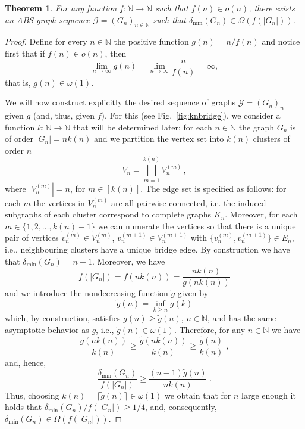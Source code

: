 \documentclass[a4paper,onecolumn,accepted=2024-12-14]{quantumarticle}
\newtheorem{theorem}{Theorem}[section]%
\theoremstyle{plain}
\newcommand{\cG}{{\mathcal G}}         %
\newcommand{\N}{\mathbb{N}} %
\begin{document}
\begin{theorem}\label{th:highdegABS}
For any function $f\colon\mathbb{N}\to\mathbb{N}$ such that $f(n)\in o(n)$, there exists an ABS graph sequence $\mathcal{G}=(G_n)_{n\in\mathbb{N}}$ such that
$\delta_{\mathrm{min}}(G_n)\in\Omega(f(|G_n|))$.
\end{theorem}
\begin{proof}
Define for every $n\in\mathbb{N}$ the positive function $g(n)=n/f(n)$ and notice first that if $f(n)\in o(n)$, then
\begin{equation}\label{eq:highdegABS}
    \lim_{n\to\infty} g(n)=\lim_{n\to\infty}\frac{n}{f(n)}=\infty,
\end{equation}
that is, $g(n)\in\omega(1)$.

We will now construct explicitly the desired sequence of graphs $\cG=(G_n)_n$ given $g$ (and, thus, given $f$).
For this (see Fig.~\ref{fig:knbridge}), we consider a function $k\colon\mathbb{N}\to\mathbb{N}$ that will be determined later; for each $n\in\N$ the graph $G_n$ is of order
$|G_n|=nk(n)$ and we partition the vertex set into $k(n)$ clusters of
order $n$
\begin{equation}
V_n=\bigsqcup_{m=1}^{k(n)}V_n^{(m)}\,,
\end{equation}
where $|V_n^{(m)}|=n$, for $m\in [k(n)]$. The edge set is specified as follows: for each $m$ the vertices in $V_n^{(m)}$ are all pairwise connected, i.e.
the induced subgraphs of each cluster correspond to complete graphs $K_n$.
Moreover, for each $m\in \{ 1,2,\dots,k(n)-1\}$ we can numerate the vertices
so that there is a unique pair of vertices $v_n^{(m)}\in V_n^{(m)}$,
$v_n^{(m+1)}\in V_n^{(m+1)}$ with $\{v_n^{(m)},v_n^{(m+1)}\}\in E_n$,
i.e., neighbouring clusters have a unique bridge edge. By construction
we have that $\delta_{\mathrm{min}}(G_n)=n-1$. Moreover, we have
\begin{equation}
f(|G_n|)=f(nk(n))=\frac{nk(n)}{g(nk(n))}
\end{equation}
and we introduce the nondecreasing function
$\tilde{g}$ given by
\begin{equation}
\tilde{g}(n)=\inf_{k\geq n}g(k)
\end{equation}
which, by construction, satisfies $g(n)\geq \tilde{g}(n)$, $n\in\mathbb{N}$, and
has the same asymptotic behavior as $g$, i.e., $\tilde{g}(n)\in\omega(1)$.
Therefore, for any $n\in\N$ we have
\begin{equation}
\frac{g(nk(n))}{k(n)}\geq\frac{\tilde{g}(nk(n))}{k(n)}
                     \geq\frac{\tilde{g}(n)}{k(n)}\;,
\end{equation}
and, hence,
\begin{equation}
    \frac{\delta_{\mathrm{min}}(G_n)}{f(|G_n|)}\geq\frac{(n-1)\tilde{g}(n)}{nk(n)}\;.
\end{equation}
Thus, choosing $k(n)=\lceil\tilde{g}(n)\rceil\in\omega(1)$ we obtain that for $n$
large enough it holds that \linebreak $\delta_{\mathrm{min}}(G_n)/f(|G_n|)\geq 1/4$, and, consequently, $\delta_{\mathrm{min}}(G_n)\in\Omega(f(|G_n|))$.


\end{proof}
\end{document}
